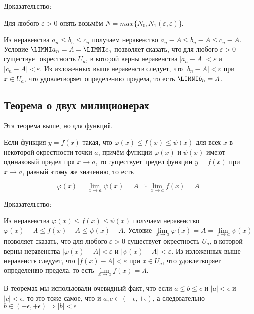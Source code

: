 Доказательство:

Для любого $\varepsilon > 0$ опять возьмём  $N=max\{N_0, N_1(\varepsilon, \varepsilon)\}$.


Из неравенства $a_n \le b_n \le c_n$ получаем неравенство $a_n-A \leqslant b_n -A \leqslant c_n-A$. Условие $\LIMNI a_n =A= \LIMNI c_n $ позволяет сказать, что для любого $\varepsilon > 0$ существует окрестность $\displaystyle U_{a}$, в которой верны неравенства $\left|a_n -A\right|<\varepsilon$  и $\left|c_n-A\right|<\varepsilon$. Из изложенных выше неравенств следует, что $\left|b_n-A\right|<\varepsilon$  при $x\in U_{a}$, что удовлетворяет определению предела, то есть $\LIMNI b_n=A$.

\subsection{Теорема о двух милиционерах}

Эта теорема выше, но для функций.

Если функция $y=f(x)$ такая, что $\varphi (x)\leqslant f(x)\leqslant \psi (x)$ для всех $x$ в некоторой окрестности точки $a$, причём функции $\varphi (x)$ и $\psi(x)$ имеют одинаковый предел при $x\to a$, то существует предел функции $y=f(x)$ при $x\to a$, равный этому же значению, то есть

$$\varphi (x)=\lim _{{x\to a}}\psi (x)=A\Rightarrow \lim _{{x\to a}}f(x)=A$$

Доказательство:

Из неравенства $\varphi (x)\leqslant f(x)\leqslant \psi (x)$ получаем неравенство $\varphi (x)-A\leqslant f(x)-A\leqslant \psi (x)-A$. Условие $\lim \limits _{{x\to a}}\varphi (x)=A=\lim \limits _{{x\to a}}\psi (x)$ позволяет сказать, что для любого $\varepsilon > 0$ существует окрестность $\displaystyle U_{a}$, в которой верны неравенства $\left|\varphi (x)-A\right|<\varepsilon$  и $\left|\psi (x)-A\right|<\varepsilon$. Из изложенных выше неравенств следует, что $\left|f(x)-A\right|<\varepsilon$  при $x\in U_{a}$, что удовлетворяет определению предела, то есть $\lim \limits _{{x\to a}}f(x)=A$.

В теоремах мы использовали очевидный факт, что если $a \le b \le c$ и $|a| < \epsilon$ и $|c| < \epsilon$, то это тоже самое, что и $a, c \in (-\epsilon, +\epsilon)$, а следовательно $b \in (-\epsilon, +\epsilon) \Rightarrow |b| < \epsilon$

\pagebreak